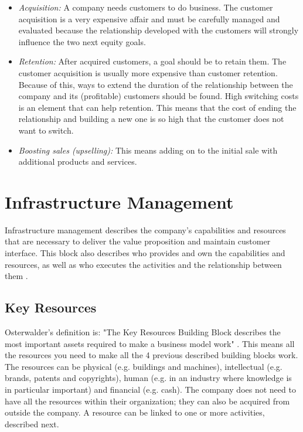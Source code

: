 \begin{itemize}
\renewcommand{\labelitemi}{$\bullet$}
\item \emph{Acquisition:} A company needs customers to do business. The customer acquisition is a very expensive affair and must be carefully managed and evaluated because the relationship developed with the customers will strongly influence the two next equity goals.
\item \emph{Retention:} After acquired customers, a goal should be to retain them. The customer acquisition is usually more expensive than customer retention. Because of this, ways to extend the duration of the relationship between the company and its (profitable) customers should be found. High switching costs is an element that can help retention. This means that the cost of ending the relationship and building a new one is so high that the customer does not want to switch.
\item \emph{Boosting sales (upselling):} This means adding on to the initial sale with additional products and services.
\end{itemize}

\section{Infrastructure Management}
Infrastructure management describes the company's capabilities and resources that are necessary to deliver the value proposition and maintain customer interface. This block also describes who provides and own the capabilities and resources, as well as who executes the activities and the relationship between them \cite{osterwalderthesis}.

\subsection{Key Resources}
Osterwalder's definition is: "The Key Resources Building Block describes the most important assets required to make a business model work" \cite{osterwalder}. This means all the resources you need to make all the 4 previous described building blocks work. The resources can be physical (e.g. buildings and machines), intellectual (e.g. brands, patents and copyrights), human (e.g. in an industry where knowledge is in particular important) and financial (e.g. cash). The company does not need to have all the resources within their organization; they can also be acquired from outside the company. A resource can be linked to one or more activities, described next.

